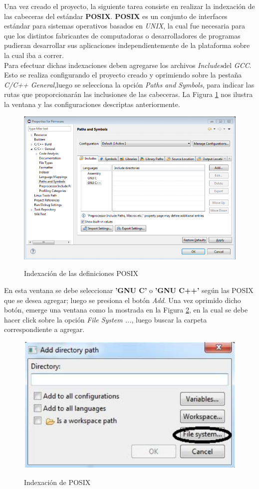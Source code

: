 \documentclass[12pt,letterpaper]{article}
\begin{document}
Una vez creado el proyecto, la siguiente tarea consiste en realizar la indexación de las cabeceras del estándar \textbf{POSIX}.
\textbf{POSIX} es un conjunto de interfaces estándar para sistemas operativos basados en \textit{UNIX}, la cual fue necesaria para que los distintos fabricantes de computadoras o desarrolladores de programas pudieran desarrollar sus aplicaciones independientemente de la plataforma sobre la cual iba a correr.\\
Para efectuar dichas indexaciones deben agregarse los archivos \textit{Includes}del \textit{GCC}. Esto se realiza configurando el proyecto creado y oprimiendo sobre la pestaña \textit{C/C++ General},luego se selecciona la opción \textit{Paths and Symbols}, para indicar las rutas que proporcionarán las inclusiones de las cabeceras. La Figura \ref{primer_proy4} nos ilustra la ventana y las configuraciones descriptas anteriormente.

\begin{center}
\begin{figure}[!h]
\centering
\includegraphics[width=8 cm]{figuras/primer_proy4.png}\\
\caption{Indexación de las definiciones POSIX}
\label{primer_proy4}
\end{figure}
\end{center}

En esta ventana se debe seleccionar \textbf{'GNU C'} o \textbf{'GNU C++'} según las POSIX que se desea agregar; luego se presiona el botón \textit{Add}. Una vez oprimido dicho botón, emerge una ventana como la mostrada en la Figura \ref{primer_proy5}, en la cual se debe hacer click sobre la opción \textit{File System ...}, luego buscar la carpeta correspondiente a agregar.

\begin{center}
\begin{figure}[!h]
\centering
\includegraphics[width=8 cm]{figuras/primer_proy5.png}\\
\caption{Indexación de POSIX}
\label{primer_proy5}
\end{figure}
\end{center}
\end{document}
